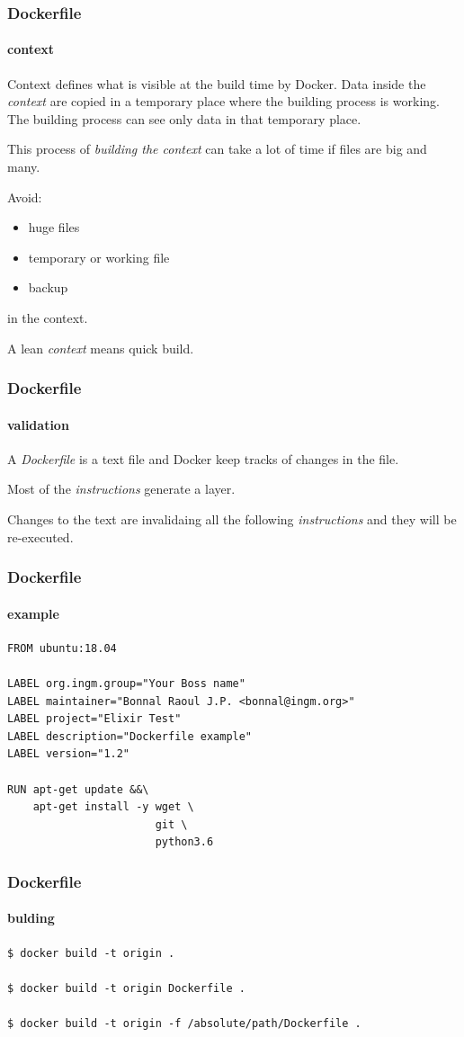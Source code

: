 \begin{frame}[fragile]
\frametitle{Dockerfile}
\framesubtitle{context}

Context defines what is visible at the build time by Docker.
Data inside the \textit{context} are copied in a temporary place where the building process is working. The building process can see only data in that temporary place. 

This process of \textit{building the context} can take a lot of time if files are big and many.

Avoid:
\begin{itemize}
\item huge files
\item temporary or working file
\item backup 
\end{itemize}

in the context.

A lean \textit{context} means quick build.
\end{frame}

\begin{frame}
\frametitle{Dockerfile}
\framesubtitle{validation}

A \textit{Dockerfile} is a text file and Docker keep tracks of changes in the file.

Most of the \textit{instructions} generate a layer. 

Changes to the text are invalidaing all the following \textit{instructions} and they will be re-executed.
\end{frame}

\begin{frame}[fragile]
\frametitle{Dockerfile}
\framesubtitle{example}

\begin{lstlisting}
FROM ubuntu:18.04

LABEL org.ingm.group="Your Boss name"
LABEL maintainer="Bonnal Raoul J.P. <bonnal@ingm.org>"
LABEL project="Elixir Test"
LABEL description="Dockerfile example"
LABEL version="1.2"

RUN apt-get update &&\
    apt-get install -y wget \
	                   git \
					   python3.6
\end{lstlisting}
\end{frame}

\begin{frame}[fragile]
\frametitle{Dockerfile}
\framesubtitle{bulding}

\begin{lstlisting}
$ docker build -t origin .

$ docker build -t origin Dockerfile .

$ docker build -t origin -f /absolute/path/Dockerfile .
\end{lstlisting}
\end{frame}

